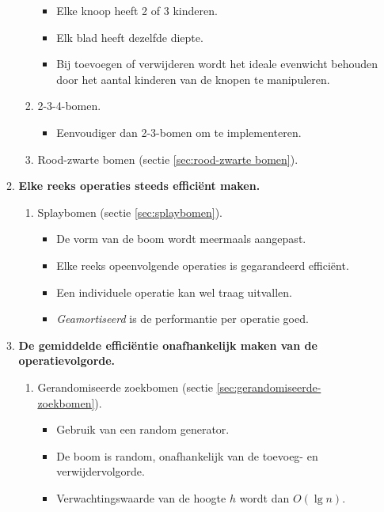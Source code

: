 \begin{itemize}
\begin{enumerate}
\begin{enumerate}
            \begin{itemize}
                \item Elke knoop heeft 2 of 3 kinderen.
                \item Elk blad heeft dezelfde diepte.
                \item Bij toevoegen of verwijderen wordt het ideale evenwicht behouden door het aantal kinderen van de knopen te manipuleren.
            \end{itemize}
            \item 2-3-4-bomen.
            \begin{itemize}
                \item Eenvoudiger dan 2-3-bomen om te implementeren.
            \end{itemize}
            \item Rood-zwarte bomen (sectie \ref{sec:rood-zwarte bomen}).
        \end{enumerate}

        \item \textbf{Elke reeks operaties steeds efficiënt maken.}
        \begin{enumerate}
            \item Splaybomen (sectie \ref{sec:splaybomen}).
            \begin{itemize}
                \item De vorm van de boom wordt meermaals aangepast.
                \item Elke reeks opeenvolgende operaties is gegarandeerd efficiënt.
                \item Een individuele operatie kan wel traag uitvallen.
                \item \textit{Geamortiseerd} is de performantie per operatie goed.
            \end{itemize}
        \end{enumerate}

        \item \textbf{De gemiddelde efficiëntie onafhankelijk maken van de operatievolgorde.}
        \begin{enumerate}
            \item Gerandomiseerde zoekbomen (sectie \ref{sec:gerandomiseerde-zoekbomen}).
            \begin{itemize}
                \item Gebruik van een random generator.
                \item De boom is random, onafhankelijk van de toevoeg- en verwijdervolgorde.
                \item Verwachtingswaarde van de hoogte $h$ wordt dan $O(\lg n)$.
            \end{itemize}
        \end{enumerate}
    \end{enumerate}
\end{itemize}

